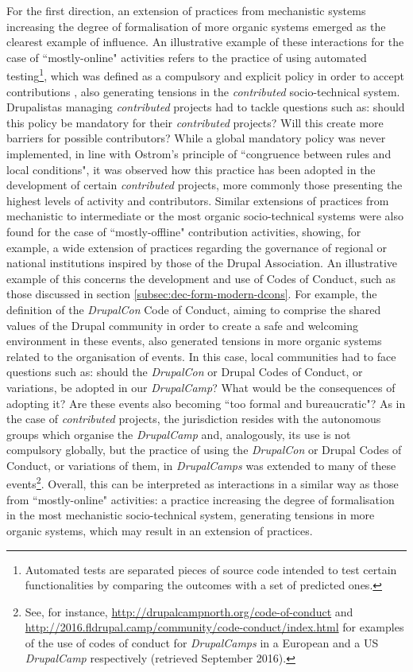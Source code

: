 For the first direction, an extension of practices from mechanistic systems increasing the degree of formalisation of more organic systems  emerged as the clearest example of influence. An illustrative example of these interactions for the case of ``mostly-online" activities refers to the practice of using automated testing\footnote{Automated tests are separated pieces of source code intended to test certain functionalities by comparing the outcomes with a set of predicted ones.}, which was defined as a compulsory and explicit policy in order to accept contributions \parencite{drupal8-automated-tests:2016:Online}, also generating tensions in the \textit{contributed} socio-technical system. Drupalistas managing \textit{contributed} projects had to tackle questions such as: should this policy be mandatory for their \textit{contributed} projects? Will this create more barriers for possible contributors? While a global mandatory policy was never implemented, in line with Ostrom's principle of ``congruence between rules and local conditions", it was observed how this practice has been adopted in the development of certain \textit{contributed} projects, more commonly those presenting the highest levels of activity and contributors. Similar extensions of practices from mechanistic to intermediate or the most organic socio-technical systems were also found for the case of ``mostly-offline" contribution activities, showing, for example, a wide extension of practices regarding the governance of regional or national institutions inspired by those of the Drupal Association. An illustrative example of this concerns the development and use of Codes of Conduct, such as those discussed in section \ref{subsec:dec-form-modern-dcons}. For example, the definition of the \textit{DrupalCon} Code of Conduct, aiming to comprise the shared values of the Drupal community in order to create a safe and welcoming environment in these events, also generated tensions in more organic systems related to the organisation of events. In this case, local communities had to face questions such as: should the \textit{DrupalCon} or Drupal Codes of Conduct, or variations, be adopted in our \textit{DrupalCamp}? What would be the consequences of adopting it? Are these events also becoming ``too formal and bureaucratic"? As in the case of \textit{contributed} projects, the jurisdiction resides with the autonomous groups which organise the \textit{DrupalCamp} and, analogously, its use is not compulsory globally, but the practice of using the \textit{DrupalCon} or Drupal Codes of Conduct, or variations of them, in \textit{DrupalCamps} was extended to many of these events\footnote{See, for instance, \url{http://drupalcampnorth.org/code-of-conduct} and \url{http://2016.fldrupal.camp/community/code-conduct/index.html} for examples of the use of codes of conduct for \textit{DrupalCamps} in a European and a US \textit{DrupalCamp} respectively (retrieved  September 2016).}. Overall, this can be interpreted as interactions in a similar way as those from ``mostly-online" activities: a practice increasing the degree of formalisation in the most mechanistic socio-technical system, generating tensions in more organic systems, which may result in an extension of practices.

